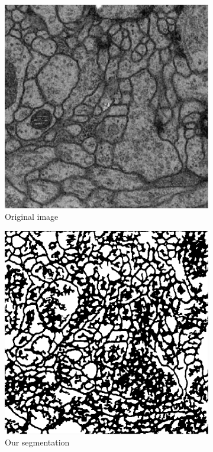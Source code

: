 \begin{figure}[!htbp]
    \centering
    \begin{subfigure}[t]{0.31\textwidth}
        \centering
        \includegraphics[height=0.7\textwidth]{./images/isbi_orig_2.png}
        \caption{Original image}
    \end{subfigure}%
    \begin{subfigure}[t]{0.31\textwidth}
        \centering
        \includegraphics[height=0.7\textwidth]{./images/isbi_out_2.png}
        \caption{Our segmentation}
    \end{subfigure}
    \begin{subfigure}[t]{0.31\textwidth}
        \centering

\end{subfigure}
\end{figure}
